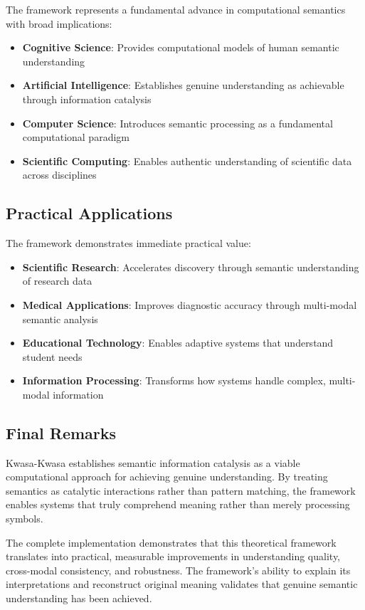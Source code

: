 \documentclass[12pt,a4paper,twoside]{article}
\begin{document}
\begin{itemize}
The framework represents a fundamental advance in computational semantics with broad implications:

\begin{itemize}
\item \textbf{Cognitive Science}: Provides computational models of human semantic understanding
\item \textbf{Artificial Intelligence}: Establishes genuine understanding as achievable through information catalysis
\item \textbf{Computer Science}: Introduces semantic processing as a fundamental computational paradigm
\item \textbf{Scientific Computing}: Enables authentic understanding of scientific data across disciplines
\end{itemize}

\subsection{Practical Applications}

The framework demonstrates immediate practical value:

\begin{itemize}
\item \textbf{Scientific Research}: Accelerates discovery through semantic understanding of research data
\item \textbf{Medical Applications}: Improves diagnostic accuracy through multi-modal semantic analysis
\item \textbf{Educational Technology}: Enables adaptive systems that understand student needs
\item \textbf{Information Processing}: Transforms how systems handle complex, multi-modal information
\end{itemize}

\subsection{Final Remarks}

Kwasa-Kwasa establishes semantic information catalysis as a viable computational approach for achieving genuine understanding. By treating semantics as catalytic interactions rather than pattern matching, the framework enables systems that truly comprehend meaning rather than merely processing symbols.

The complete implementation demonstrates that this theoretical framework translates into practical, measurable improvements in understanding quality, cross-modal consistency, and robustness. The framework's ability to explain its interpretations and reconstruct original meaning validates that genuine semantic understanding has been achieved.


\end{itemize}
\end{document}
